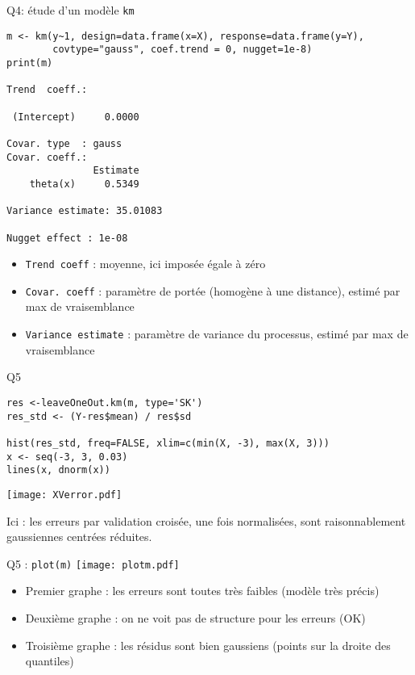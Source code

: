 \documentclass{beamer}
\begin{document}
\begin{frame}[fragile]{Q4: étude d'un modèle \texttt{km}}
 \begin{Verbatim}[fontsize=\tiny]
m <- km(y~1, design=data.frame(x=X), response=data.frame(y=Y), 
        covtype="gauss", coef.trend = 0, nugget=1e-8)
print(m)

Trend  coeff.:
                       
 (Intercept)     0.0000

Covar. type  : gauss 
Covar. coeff.:
               Estimate
    theta(x)     0.5349

Variance estimate: 35.01083

Nugget effect : 1e-08
\end{Verbatim}
\begin{itemize}
 \item \texttt{Trend coeff} : moyenne, ici imposée égale à zéro
 \item \texttt{Covar. coeff} : paramètre de portée (homogène à une distance), estimé par max de vraisemblance
 \item \texttt{Variance estimate} : paramètre de variance du processus, estimé par max de vraisemblance
\end{itemize}

\end{frame}
\begin{frame}[fragile]{Q5}
 \begin{verbatim}
res <-leaveOneOut.km(m, type='SK')
res_std <- (Y-res$mean) / res$sd

hist(res_std, freq=FALSE, xlim=c(min(X, -3), max(X, 3)))
x <- seq(-3, 3, 0.03)
lines(x, dnorm(x))
\end{verbatim}
\texttt{[image: XVerror.pdf]} 

Ici : les erreurs par validation croisée, une fois normalisées, sont raisonnablement gaussiennes centrées réduites.
\end{frame}
\begin{frame}[fragile]{Q5 : \texttt{plot(m)}}
\texttt{[image: plotm.pdf]} 
\begin{itemize}
 \item Premier graphe : les erreurs sont toutes très faibles (modèle très précis)
 \item Deuxième graphe : on ne voit pas de structure pour les erreurs (OK)
 \item Troisième graphe : les résidus sont bien gaussiens (points sur la droite des quantiles)
\end{itemize}

\end{frame}
\end{document}
